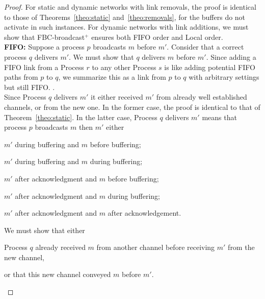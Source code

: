 \begin{proof}
  For static and dynamic networks with link removals, the proof is identical to
  those of Theorems~\ref{theo:static} and~\ref{theo:removals}, for the buffers
  do not activate in such instances. For dynamic networks with link additions,
  we must show that FBC-broadcast$^+$ ensures both
  FIFO order and Local order. \\
  \textbf{FIFO:} Suppose a process $p$ broadcasts $m$ before $m'$. Consider that
  a correct process $q$ delivers $m'$. We must show that $q$ delivers $m$ before
  $m'$.  Since adding a FIFO link from a Process $r$ to any other Process $s$ is
  like adding potential FIFO paths from $p$ to $q$, we summarize this as a link
  from $p$ to $q$ with arbitrary settings but still FIFO.  . \\   
  Since Process $q$ delivers $m'$ it either received $m'$ from already well
  established channels, or from the new one. In the former case, the proof is
  identical to that of Theorem~\ref{theo:static}. In the latter case, Process
  $q$ delivers $m'$ means that process $p$ broadcasts $m$ then $m'$ either
  \begin{inparaenum}[(i)]
  \item \label{case:one} $m'$ during buffering and $m$ before buffering;
  \item \label{case:two} $m'$ during buffering and $m$ during buffering;
  \item \label{case:three} $m'$ after acknowledgment and $m$ before buffering;
  \item \label{case:four} $m'$ after acknowledgment and $m$ during buffering;
  \item \label{case:five} $m'$ after acknowledgment and $m$ after acknowledgement.
  \end{inparaenum}
  We must show that either 
  \begin{inparaenum}[(1)]
  \item \label{show:one} Process $q$ already received $m$ from another channel
    before receiving $m'$ from the new channel,
  \item \label{show:two} or that this new channel conveyed $m$ before $m'$.
  \end{inparaenum}


\end{proof}
